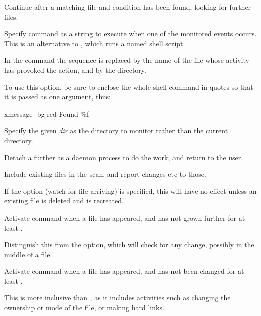 Continue \PrBtfilemon{} after a matching file and condition has been found, looking for further files.


Specify command as a string to execute when one of the monitored events occurs. This is an alternative to , which
runs a named shell script.

In the command the sequence  is replaced by the name of the file whose activity has provoked the action, and
 by the directory.

To use this option, be sure to enclose the whole shell command in quotes so that it is passed as one argument, thus:

\begin{expara}

xmessage -bg red {\textquotesingle}Found \%f{\textquotesingle}

\end{expara}


Specify the given \textit{dir} as the directory to monitor rather than the current directory.


Detach a further \PrBtfilemon{} as a daemon process to do the work, and return to the user.


Include existing files in the scan, and report changes etc to those.

If the  option (watch for file arriving) is specified, this will have no effect unless an existing file is deleted
and is recreated.


Activate command when a file has appeared, and has not grown further for at least .

Distinguish this from the  option, which will check for any change, possibly in the middle of a file.


Activate command when a file has appeared, and has not been changed for at least .

This is more inclusive than , as it includes activities such as changing the ownership or mode of the file, or making hard links.

